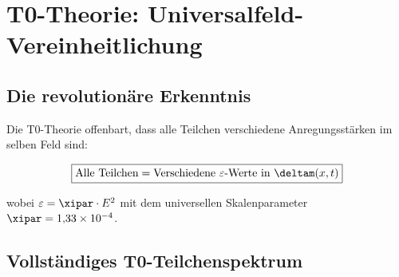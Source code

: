 	\section{T0-Theorie: Universalfeld-Vereinheitlichung}
	
	\subsection{Die revolutionäre Erkenntnis}
	
	Die T0-Theorie offenbart, dass alle Teilchen verschiedene Anregungsstärken im selben Feld sind:
	
	\begin{equation}
		\boxed{\text{Alle Teilchen} = \text{Verschiedene } \varepsilon \text{-Werte in } \deltam(x,t)}
		\label{eq:universal_particle_principle}
	\end{equation}
	
	wobei $\varepsilon = \xipar \cdot E^2$ mit dem universellen Skalenparameter $\xipar = 1{,}33 \times 10^{-4}$.
	
	\subsection{Vollständiges T0-Teilchenspektrum}
	
